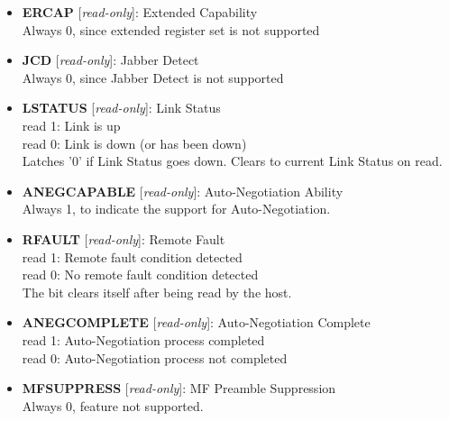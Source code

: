 \begin{itemize}
\item \begin{small}
{\bf 
ERCAP
} [\emph{read-only}]: Extended Capability
\\
Always 0, since extended register set is not supported
\end{small}
\item \begin{small}
{\bf 
JCD
} [\emph{read-only}]: Jabber Detect
\\
Always 0, since Jabber Detect is not supported
\end{small}
\item \begin{small}
{\bf 
LSTATUS
} [\emph{read-only}]: Link Status
\\
read 1: Link is up\\				                read 0: Link is down (or has been down)\\				 Latches '0' if Link Status goes down. Clears to current Link Status on read.
\end{small}
\item \begin{small}
{\bf 
ANEGCAPABLE
} [\emph{read-only}]: Auto-Negotiation Ability
\\
Always 1, to indicate the support for Auto-Negotiation.
\end{small}
\item \begin{small}
{\bf 
RFAULT
} [\emph{read-only}]: Remote Fault
\\
read 1: Remote fault condition detected\\				                read 0: No remote fault condition detected\\				 The bit clears itself after being read by the host.
\end{small}
\item \begin{small}
{\bf 
ANEGCOMPLETE
} [\emph{read-only}]: Auto-Negotiation Complete
\\
read 1: Auto-Negotiation process completed\\				                read 0: Auto-Negotiation process not completed
\end{small}
\item \begin{small}
{\bf 
MFSUPPRESS
} [\emph{read-only}]: MF Preamble Suppression
\\
Always 0, feature not supported. 
\end{small}

\end{itemize}
